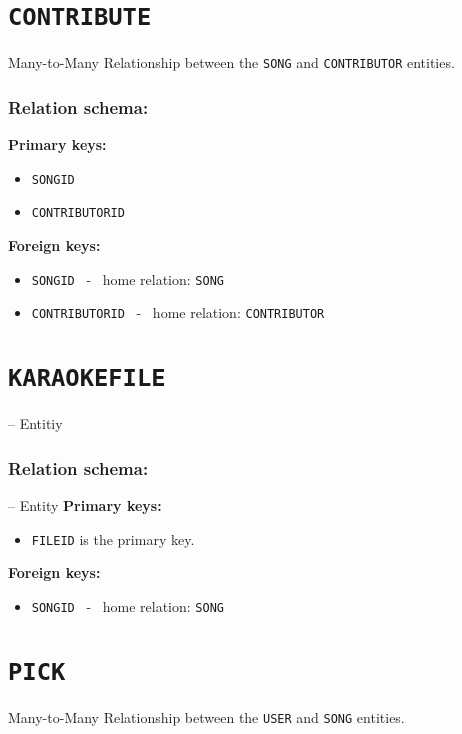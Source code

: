 \documentclass{report}
\begin{document}
\section{\texttt{CONTRIBUTE}}
Many-to-Many Relationship between the \texttt{SONG} and \texttt{CONTRIBUTOR} entities.
\subsubsection*{Relation schema:}
\bigbreak \noindent
\textbf{Primary keys:}
\begin{itemize}
    \item \texttt{SONGID}
    \item \texttt{CONTRIBUTORID}
\end{itemize}
\bigbreak \noindent
\textbf{Foreign keys:}
\begin{itemize}
    \item \texttt{SONGID} \ - \ home relation: \texttt{SONG}
    \item \texttt{CONTRIBUTORID} \ - \ home relation: \texttt{CONTRIBUTOR}
\end{itemize}
\hline
\section{\texttt{KARAOKEFILE}}
-- Entitiy
\subsubsection*{Relation schema:}
-- Entity
\bigbreak \noindent
\textbf{Primary keys:}
\begin{itemize}
    \item \texttt{FILEID} is the primary key.
\end{itemize}
\bigbreak \noindent
\textbf{Foreign keys:}
\begin{itemize}
    \item \texttt{SONGID} \ - \ home relation: \texttt{SONG}
\end{itemize}
\hline
\section{\texttt{PICK}}
Many-to-Many Relationship between the \texttt{USER} and \texttt{SONG} entities.
\end{document}
